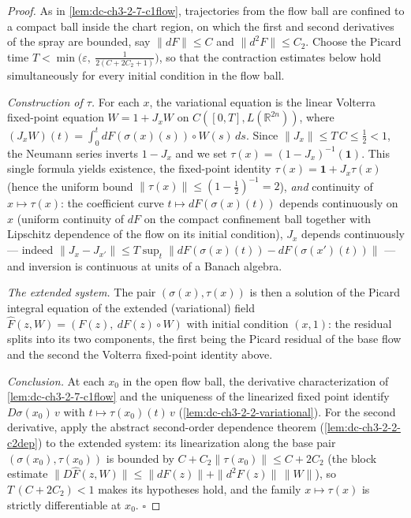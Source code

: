 \begin{proof}
  \leanok
  As in \cref{lem:dc-ch3-2-7-c1flow}, trajectories from the flow ball are
  confined to a compact ball inside the chart region, on which the first and
  second derivatives of the spray are bounded, say $\|dF\| \le C$ and
  $\|d^2F\| \le C_2$. Choose the Picard time
  $T < \min\big(\varepsilon,\ \tfrac{1}{2(C + 2C_2 + 1)}\big)$, so that the
  contraction estimates below hold simultaneously for every initial condition
  in the flow ball.

  \emph{Construction of $\tau$.} For each $x$, the variational equation is
  the linear Volterra fixed-point equation $W = 1 + J_x W$ on $C([0,T],
  L(\mathbb{R}^{2n}))$, where $(J_x W)(t) = \int_0^t dF(\sigma(x)(s)) \circ
  W(s)\, ds$. Since $\|J_x\| \le T\,C \le \tfrac12 < 1$, the Neumann series
  inverts $1 - J_x$ and we set $\tau(x) = (1 - J_x)^{-1}(\mathbf{1})$. This
  single formula yields existence, the fixed-point identity
  $\tau(x) = \mathbf{1} + J_x \tau(x)$ (hence the uniform bound
  $\|\tau(x)\| \le (1 - \tfrac12)^{-1} = 2$), \emph{and} continuity of
  $x \mapsto \tau(x)$: the coefficient curve $t \mapsto dF(\sigma(x)(t))$
  depends continuously on $x$ (uniform continuity of $dF$ on the compact
  confinement ball together with Lipschitz dependence of the flow on its
  initial condition), $J_x$ depends continuously — indeed
  $\|J_x - J_{x'}\| \le T \sup_t \|dF(\sigma(x)(t)) - dF(\sigma(x')(t))\|$ —
  and inversion is continuous at units of a Banach algebra.

  \emph{The extended system.} The pair $(\sigma(x), \tau(x))$ is then a
  solution of the Picard integral equation of the extended (variational)
  field $\hat F(z, W) = (F(z),\ dF(z) \circ W)$ with initial condition
  $(x, 1)$: the residual splits into its two components, the first being the
  Picard residual of the base flow and the second the Volterra fixed-point
  identity above.

  \emph{Conclusion.} At each $x_0$ in the open flow ball, the derivative
  characterization of \cref{lem:dc-ch3-2-7-c1flow} and the uniqueness of the
  linearized fixed point identify $D\sigma(x_0)\,v$ with
  $t \mapsto \tau(x_0)(t)\,v$ (\cref{lem:dc-ch3-2-2-variational}). For the
  second derivative, apply the abstract second-order dependence theorem
  (\cref{lem:dc-ch3-2-2-c2dep}) to the extended system: its linearization
  along the base pair $(\sigma(x_0), \tau(x_0))$ is bounded by
  $C + C_2 \|\tau(x_0)\| \le C + 2C_2$ (the block estimate
  $\|D\hat F(z, W)\| \le \|dF(z)\| + \|d^2F(z)\|\,\|W\|$), so
  $T\,(C + 2C_2) < 1$ makes its hypotheses hold, and the family
  $x \mapsto \tau(x)$ is strictly differentiable at $x_0$. $\square$
\end{proof}

